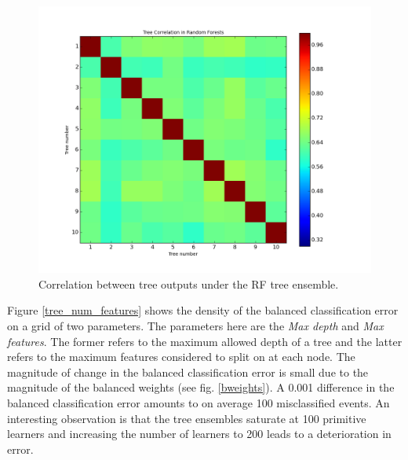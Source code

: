 \begin{figure}[h]
\centering
\includegraphics[scale=0.5]{images/RF_tree_correlation.png}
\caption{Correlation between tree outputs under the RF tree ensemble.}
\label{et_tree_correlation}
\end{figure}

Figure \ref{tree_num_features} shows the density of the balanced classification error on a grid of two parameters. The parameters here are the \textit{Max depth} and \textit{Max features}. The former refers to the maximum allowed depth of a tree and the latter refers to the maximum features considered to split on at each node. The magnitude of change in the balanced classification error is small due to the magnitude of the balanced weights (see fig. \ref{bweights}). A 0.001 difference in the balanced classification error amounts to on average 100 misclassified events. An interesting observation is that the tree ensembles saturate at 100 primitive learners and increasing the number of learners to 200 leads to a deterioration in error. %


